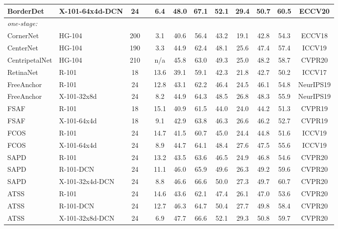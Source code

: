 \documentclass[10pt,twocolumn,letterpaper]{article}
\begin{document}
\begin{table*}[t]
\begin{threeparttable}
{\begin{tabular}{l|l|c|c|c|ccc|ccc|c}
				BorderDet \cite{qiu2020borderdet} & X-101-64x4d-DCN & 24 &  & 6.4 &  48.0 & 67.1 & 52.1 & 29.4 & 50.7 & 60.5 & ECCV20\\
				\hline
				\hline
				\textit{one-stage:}   & & & & & & & & & & & \\
				CornerNet \cite{law2018cornernet} &HG-104 & 200 &  & 3.1 & 40.6 & 56.4 & 43.2 & 19.1 & 42.8 & 54.3 & ECCV18 \\
CenterNet \cite{duan2019centernet} &HG-104 & 190 &   & 3.3 &44.9 &62.4 &48.1 &25.6 &47.4 &57.4 & ICCV19 \\
				CentripetalNet \cite{dong2020centripetalnet} & HG-104 & 210 &  & n/a  & 45.8 & 63.0 & 49.3 & 25.0 & 48.2 & 58.7 & CVPR20\\
RetinaNet \cite{lin2017focal} &R-101 &  18 &  & 13.6 &39.1 &59.1 &42.3 &21.8 &42.7 &50.2 & ICCV17 \\
				FreeAnchor \cite{zhang2019freeanchor} & R-101 & 24 &  & 12.8 & 43.1 & 62.2 & 46.4 & 24.5 & 46.1 & 54.8 & NeurIPS19 \\
				FreeAnchor \cite{zhang2019freeanchor} & X-101-32x8d & 24 &  & 8.2 & 44.9 & 64.3 & 48.5 & 26.8 & 48.3 & 55.9 & NeurIPS19 \\
FSAF \cite{zhu2019feature} & R-101 & 18 &  & 15.1 & 40.9 & 61.5 & 44.0 & 24.0 & 44.2 & 51.3 & CVPR19\\
				FSAF \cite{zhu2019feature}& X-101-64x4d & 18 &  & 9.1 & 42.9 & 63.8 & 46.3 & 26.6 & 46.2 & 52.7 & CVPR19 \\
				FCOS \cite{tian2019fcos} & R-101 & 24 &  & 14.7 &41.5 & 60.7 & 45.0 & 24.4 & 44.8 & 51.6 & ICCV19\\
				FCOS \cite{tian2019fcos} & X-101-64x4d & 24 &  & 8.9 & 44.7 & 64.1 & 48.4 & 27.6 & 47.5 & 55.6 & ICCV19\\
				SAPD \cite{zhu2019soft}& R-101 & 24 &  & 13.2 & 43.5 & 63.6 & 46.5 & 24.9 & 46.8 & 54.6 & CVPR20 \\
SAPD \cite{zhu2019soft}&  R-101-DCN & 24 &  & 11.1 & 46.0 & 65.9 & 49.6 & 26.3 & 49.2 & 59.6 & CVPR20 \\
				SAPD \cite{zhu2019soft}& X-101-32x4d-DCN & 24 &  & 8.8 & 46.6 & 66.6 & 50.0 & 27.3 & 49.7 & 60.7 & CVPR20 \\
				ATSS \cite{zhang2019bridging}& R-101 & 24 &  & 14.6 &43.6 &62.1 &47.4 &26.1 &47.0 &53.6 & CVPR20 \\
ATSS \cite{zhang2019bridging} &R-101-DCN & 24 &   & 12.7 & 46.3 &64.7 &50.4 &27.7 &49.8 &58.4 & CVPR20\\
				ATSS \cite{zhang2019bridging}& X-101-32x8d-DCN & 24 &  & 6.9 & {47.7} & {66.6} &{52.1} & {29.3} &50.8 & {59.7} & CVPR20 \\

\end{tabular}}
\end{threeparttable}
\end{table*}
\end{document}
